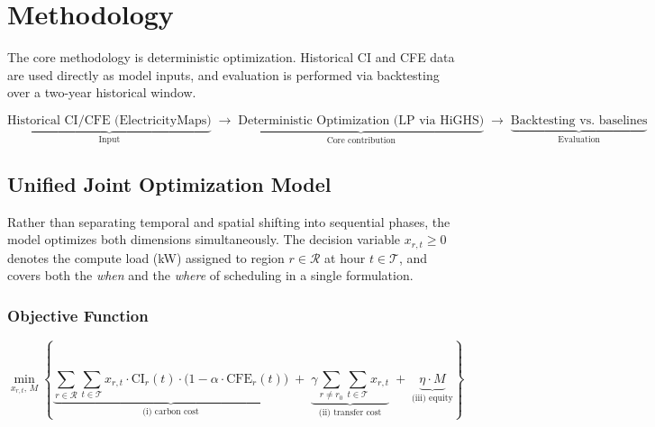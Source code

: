 \documentclass[11pt, a4paper]{article}
\begin{document}
\section{Methodology}

The core methodology is deterministic optimization. Historical CI and CFE data are used directly as model inputs, and evaluation is performed via backtesting over a two-year historical window.

{\small\[
  \underbrace{\text{Historical CI/CFE (ElectricityMaps)}}_{\text{Input}}
  \;\longrightarrow\;
  \underbrace{\text{Deterministic Optimization (LP via HiGHS)}}_{\text{Core contribution}}
  \;\longrightarrow\;
  \underbrace{\text{Backtesting vs.\ baselines}}_{\text{Evaluation}}
\]}

\subsection{Unified Joint Optimization Model}

Rather than separating temporal and spatial shifting into sequential phases, the model optimizes both dimensions simultaneously. The decision variable \(x_{r,t} \geq 0\) denotes the compute load (kW) assigned to region \(r \in \mathcal{R}\) at hour \(t \in \mathcal{T}\), and covers both the \emph{when} and the \emph{where} of scheduling in a single formulation.

\subsubsection{Objective Function}

\begin{equation}
  \min_{x_{r,t},\,M} \left\{
    \underbrace{\sum_{r \in \mathcal{R}} \sum_{t \in \mathcal{T}}
      x_{r,t} \cdot \text{CI}_r(t) \cdot \bigl(1 - \alpha \cdot \text{CFE}_r(t)\bigr)}_{\text{(i) carbon cost}}
  \;+\;
    \underbrace{\gamma \sum_{r \neq r_0} \sum_{t \in \mathcal{T}} x_{r,t}}_{\text{(ii) transfer cost}}
  \;+\;
    \underbrace{\eta \cdot M}_{\text{(iii) equity}}
  \right\}
  \label{eq:objective}
\end{equation}
\end{document}
